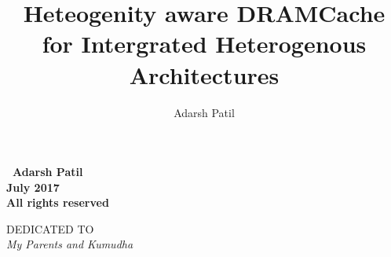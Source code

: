 \documentclass[oneside,12pt]{iiscmastersthesis}
\newcommand{\blankpage}{
\newpage
\thispagestyle{empty}
\mbox{}
\newpage
}
\begin{document}
\title{Heteogenity aware DRAMCache for Intergrated Heterogenous Architectures} 

\author{Adarsh Patil}



\maketitle

\newpage

\vspace*{\fill}
\begin{center}
\large\bf \textcopyright \ Adarsh Patil\\
\large\bf July 2017\\
\large\bf All rights reserved
\end{center}
\vspace*{\fill}
\thispagestyle{empty}

\newpage

\vspace*{\fill}
\begin{center}
DEDICATED TO \\[2em]
\Large\it My Parents and Kumudha
\end{center}
\vspace*{\fill}
\thispagestyle{empty}


\end{document}
